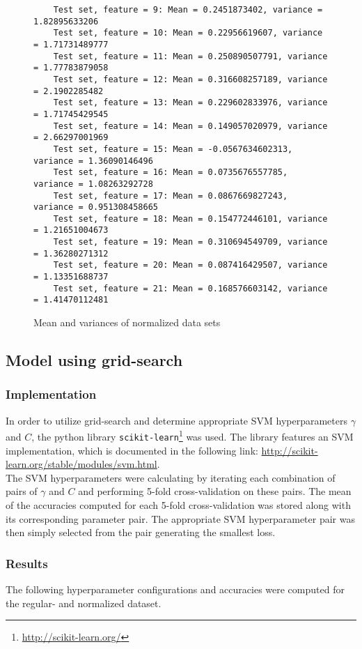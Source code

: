 \documentclass[a4paper]{article}
\begin{document}
\begin{figure}[H]
\begin{lstlisting}
	Test set, feature = 9: Mean = 0.2451873402, variance = 1.82895633206
	Test set, feature = 10: Mean = 0.22956619607, variance = 1.71731489777
	Test set, feature = 11: Mean = 0.250890507791, variance = 1.77783879058
	Test set, feature = 12: Mean = 0.316608257189, variance = 2.1902285482
	Test set, feature = 13: Mean = 0.229602833976, variance = 1.71745429545
	Test set, feature = 14: Mean = 0.149057020979, variance = 2.66297001969
	Test set, feature = 15: Mean = -0.0567634602313, variance = 1.36090146496
	Test set, feature = 16: Mean = 0.0735676557785, variance = 1.08263292728
	Test set, feature = 17: Mean = 0.0867669827243, variance = 0.951308458665
	Test set, feature = 18: Mean = 0.154772446101, variance = 1.21651004673
	Test set, feature = 19: Mean = 0.310694549709, variance = 1.36280271312
	Test set, feature = 20: Mean = 0.087416429507, variance = 1.13351688737
	Test set, feature = 21: Mean = 0.168576603142, variance = 1.41470112481
	\end{lstlisting}
	\caption{Mean and variances of normalized data sets}
	\label{fig:mean_variance_data}
\end{figure}

\subsection{Model using grid-search}
\subsubsection{Implementation}
In order to utilize grid-search and determine appropriate SVM hyperparameters $\gamma$ and $C$, the python library \texttt{scikit-learn}\footnote{\url{http://scikit-learn.org/}} was used. The library features an SVM implementation, which is documented in the following link: \url{http://scikit-learn.org/stable/modules/svm.html}.\\

The SVM hyperparameters were calculating by iterating each combination of pairs of $\gamma$ and $C$ and performing 5-fold cross-validation on these pairs. The mean of the accuracies computed for each 5-fold cross-validation was stored along with its corresponding parameter pair. The appropriate SVM hyperparameter pair was then simply selected from the pair generating the smallest loss.

\subsubsection{Results}
The following hyperparameter configurations and accuracies were computed for the regular- and normalized dataset.
\end{document}

